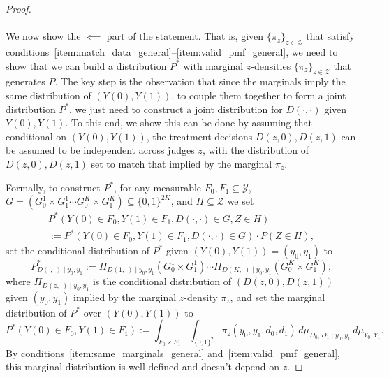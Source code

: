 \documentclass[12pt]{article}%
\theoremstyle{definition}
\newcommand\1{\operatorname{I}\indicatorfence}
\begin{document}
\begin{appendices}
\begin{proof}
  \paragraph{\mbox{}} We now show the $\impliedby$ part of the statement.
  That is, given $\{\pi_{z}\}_{z \in \mathcal{Z}}$ that satisfy
  conditions~\ref{item:match_data_general}--\ref{item:valid_pmf_general}, we
  need to show that we can build a distribution $P^*$ with marginal
  $z$-densities $\{\pi_{z}\}_{z \in \mathcal{Z}}$ that generates $P$. The key step is the observation that since the marginals imply the same distribution of $(Y(0), Y(1))$, to couple them together to form a joint distribution $P^*$, we just need to construct a joint distribution for $D(\cdot, \cdot)$ given $Y(0), Y(1)$. To this end, we show this can be done by assuming that conditional on $(Y(0), Y(1))$, the treatment decisions $D(z,0), D(z,1)$ can be assumed to be independent across judges $z$, with the distribution of $D(z,0), D(z,1)$ set to match that implied by the marginal $\pi_z$.

  Formally, to construct $P^{*}$, for any measurable $F_0,F_1 \subseteq \mathcal{Y}$,
  $G =(G_{0}^1 \times G_{1}^{1} \dotsb G^{K}_{0} \times G^{K}_{1})\subseteq
  \{0,1\}^{2K}$, and $H \subseteq \mathcal{Z}$ we set
  \begin{multline*}
    P^* \left(Y(0) \in F_0, Y(1) \in F_1, D(\cdot, \cdot) \in G, Z \in H \right)\\
    :=P^{*} \left(Y(0) \in F_0, Y(1) \in F_1, D(\cdot, \cdot) \in G \right)
    \cdot
    P(Z \in H),
  \end{multline*}
  set the conditional distribution of $P^{*}$ given $(Y(0), Y(1))=(y_{0}, y_{1})$ to
  \begin{equation}\label{eq:pstar_given_y0y1}
    P^{*}_{D(\cdot, \cdot)\mid y_{0}, y_{1}}:=
    \Pi_{D(1, \cdot)\mid y_0, y_1} \left(G_0^1 \times G^1_1 \right) \dotsb \Pi_{D(K, \cdot)\mid y_0, y_1} \left(G_0^K \times G^K_1 \right),
  \end{equation}
  where $\Pi_{D(z, \cdot)\mid y_0, y_1}$ is the conditional distribution of
  $(D(z, 0), D(z, 1))$ given $(y_0, y_1)$ implied by the marginal $z$-density
  $\pi_{z}$, and set the marginal
  distribution of $P^{*}$ over $(Y(0), Y(1))$ to
  \begin{equation}\label{eq:pstar_marginal_y0y1}
    P^{*}(Y(0)\in F_{0}, Y(1)\in F_{1}):=\int_{F_0 \times F_1}\int_{\{0,1\}^2}
    \pi_{z}(y_0, y_1, d_0, d_1)
    \, d\mu_{D_{0}, D_{1}\mid y_{0}, y_{1}}\, d\mu_{Y_{0}, Y_{1}}.
  \end{equation}
  By conditions~\ref{item:same_marginals_general}
  and~\ref{item:valid_pmf_general}, this marginal distribution is well-defined
  and doesn't depend on $z$.


\end{proof}
\end{appendices}
\end{document}
